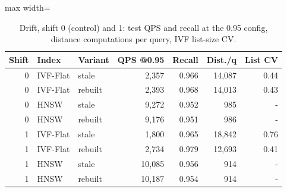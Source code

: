 \begin{table}[!t]
\centering
\footnotesize
\begin{adjustbox}{max width=\linewidth}
\begin{tabular}{rllrrrr}
\toprule
Shift & Index & Variant & QPS @0.95 & Recall & Dist./q & List CV \\
\midrule
0 & IVF-Flat & stale & 2,357 & 0.966 & 14,087 & 0.44 \\
0 & IVF-Flat & rebuilt & 2,393 & 0.968 & 14,013 & 0.43 \\
0 & HNSW & stale & 9,272 & 0.952 & 985 & - \\
0 & HNSW & rebuilt & 9,176 & 0.951 & 986 & - \\
1 & IVF-Flat & stale & 1,800 & 0.965 & 18,842 & 0.76 \\
1 & IVF-Flat & rebuilt & 2,734 & 0.979 & 12,693 & 0.41 \\
1 & HNSW & stale & 10,085 & 0.956 & 914 & - \\
1 & HNSW & rebuilt & 10,187 & 0.954 & 914 & - \\
\bottomrule
\end{tabular}
\end{adjustbox}
\caption{Drift, shift 0 (control) and 1: test QPS and recall at the 0.95 config, distance computations per query, IVF list-size CV.}
\label{tab:part4c}
\end{table}
